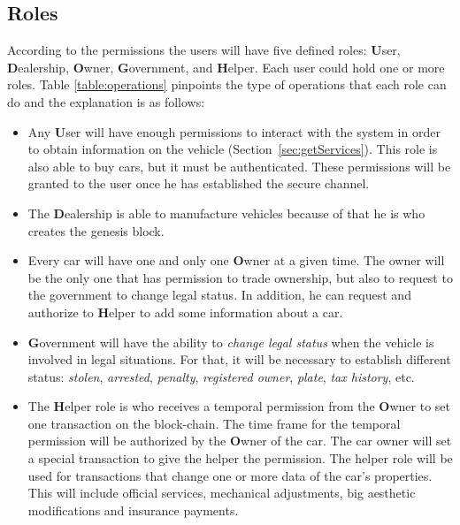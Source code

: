 \subsection{Roles}

According to the permissions the users will have five defined roles: 
\textbf{U}ser,
\textbf{D}ealership,
\textbf{O}wner,
\textbf{G}overnment, and
\textbf{H}elper.
Each user could hold one or more roles.
Table \ref{table:operations} pinpoints the type of operations that each role can do and the explanation
is as follows: 
\begin{itemize}
    \item Any \textbf{U}ser will have enough permissions to interact with the system in order to 
        obtain information on the vehicle (Section~\ref{sec:getServices}). This role is also able 
        to buy cars, but it must be authenticated. 
        These permissions will be granted to the user once he has established the secure channel. 
    \item The \textbf{D}ealership is able to manufacture vehicles because of that he is who creates the 
        genesis block.
    \item Every car will have one and only one \textbf{O}wner at a given time. The owner will be the only one 
        that has permission to trade ownership, but also to request to the government to change legal
        status. In addition, he can request and authorize to \textbf{H}elper to add some information 
        about a car.
    \item \textbf{G}overnment will have the ability to  \textit{change legal status} when the 
        vehicle is involved in legal situations. For that, it will be necessary to establish 
        different status: \textit{stolen}, \textit{arrested}, \textit{penalty}, \textit{registered owner}, \textit{plate}, 
        \textit{tax history}, etc.
    \item The \textbf{H}elper role is who receives a temporal permission from the \textbf{O}wner to set one 
        transaction on the block-chain. The time frame for the temporal permission will be authorized by 
        the \textbf{O}wner of the car. The car owner will set a special transaction to give the helper 
        the permission. The helper role will be used for transactions that change one or more data of the 
        car's properties. This will include official services, mechanical adjustments, big aesthetic 
        modifications and insurance payments.
\end{itemize}

